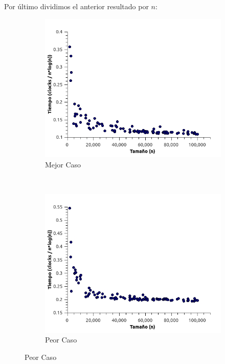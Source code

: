 Por último dividimos el anterior resultado por $n$:

\begin{figure}[H]
        \centering
        \begin{subfigure}[b]{0.5\textwidth}
                \includegraphics[width=\textwidth]{imagenes/grafico1-mejor3.jpg}
                \caption{Mejor Caso}
        \end{subfigure}%
        ~ %
        \begin{subfigure}[b]{0.5\textwidth}
                \includegraphics[width=\textwidth]{imagenes/grafico1-peor3.jpg}
                \caption{Peor Caso}
        \end{subfigure}

\end{figure}

